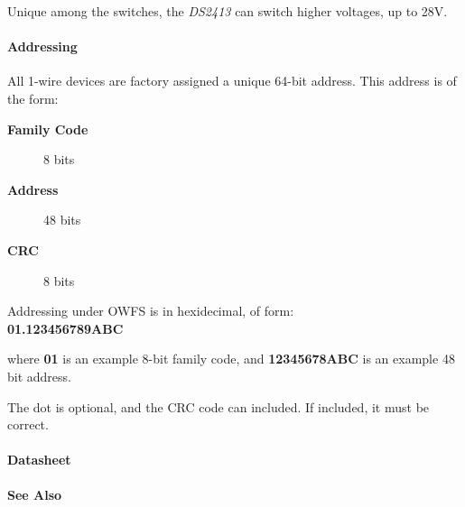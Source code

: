 Unique among the switches, the \textit{DS2413} can switch higher voltages, up to
28V. 
\paragraph*{Addressing}
          All 1-wire devices are factory assigned a unique
64-bit address. This address is of the form: \begin{description}
\item [\textbf{Family Code} ] 8 bits 
\item [\textbf{Address} ] 48
bits 
\item [\textbf{CRC} ] 8 bits 
\end{description}


\begin{description}
\item [Addressing under OWFS is in hexidecimal, of form: ] 
\item [\textbf{01.123456789ABC}
] 
\end{description}


where \textbf{01} is an example 8-bit family code, and \textbf{12345678ABC} is an example
48 bit address. 

The dot is optional, and the CRC code can included. If included,
it must be correct.  
\paragraph*{Datasheet}


\paragraph*{See Also}


